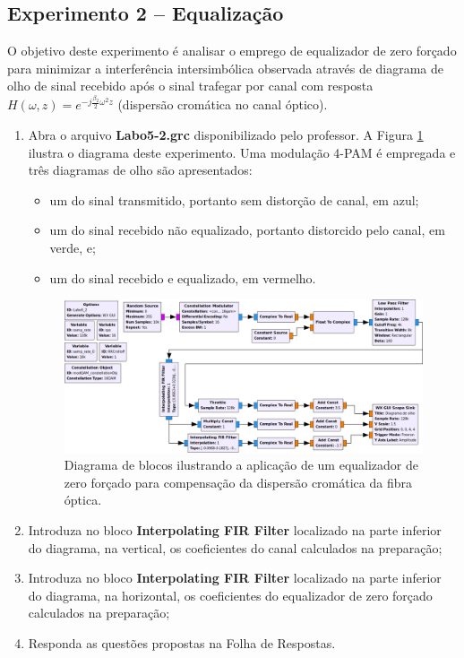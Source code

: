 \documentclass[12pt,addpoints]{exam}
\begin{document}
\subsection{Experimento 2 -- Equalização}

O objetivo deste experimento é analisar o emprego de equalizador de zero forçado para minimizar a interferência intersimbólica observada através de diagrama de olho de sinal recebido após o sinal trafegar por canal com resposta $H(\omega, z) = e^{-j\frac{\beta_2}{2} \omega^2z}$ (dispersão cromática no canal óptico).

\begin{enumerate}
    \item Abra o arquivo \textbf{Labo5-2.grc} disponibilizado pelo professor. A Figura \ref{fig:GRC_5-2} ilustra o diagrama deste experimento. Uma modulação 4-PAM é empregada e três diagramas de olho são apresentados: 
    \begin{itemize}
        \item um do sinal transmitido, portanto sem distorção de canal, em azul;
        \item um do sinal recebido não equalizado, portanto distorcido pelo canal, em verde, e;
        \item um do sinal recebido e equalizado, em vermelho.
    \end{itemize}
    \begin{figure}[htb]
        \centering
        \includegraphics[width=\textwidth]{Figuras/Labo5-2}
        \caption{Diagrama de blocos ilustrando a aplicação de um equalizador de zero forçado para compensação da dispersão cromática da fibra óptica.}
        \label{fig:GRC_5-2}
    \end{figure}
    \item Introduza no bloco \textbf{Interpolating FIR Filter} localizado na parte inferior do diagrama, na vertical, os coeficientes do canal calculados na preparação;
    \item Introduza no bloco \textbf{Interpolating FIR Filter} localizado na parte inferior do diagrama, na horizontal, os coeficientes do equalizador de zero forçado calculados na preparação;
    \item Responda as questões propostas na Folha de Respostas.
\end{enumerate}
\end{document}
